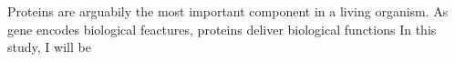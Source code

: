 Proteins are arguabily  the most important component in a living organism. As gene encodes biological feactures, proteins deliver biological functions   In this study, I will be 